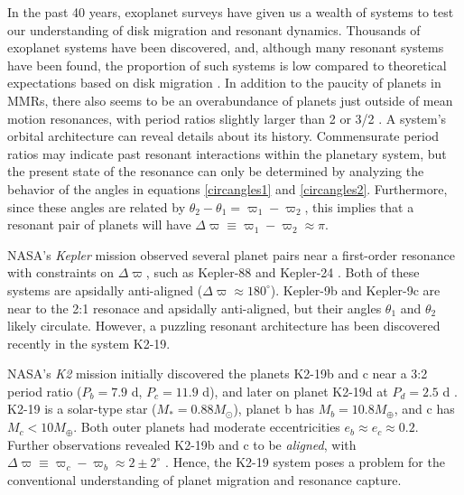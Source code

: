 \documentclass{mnras}
\begin{document}
In the past 40 years, exoplanet surveys have given us a wealth of
systems to test our understanding of disk migration and resonant
dynamics.  Thousands of exoplanet systems have been discovered, and,
although many resonant systems have been found, the proportion of such
systems is low compared to theoretical expectations based on disk
migration \cite{fabrycky_architecture_2014}.  In addition to the paucity
of planets in MMRs, there also seems to be an overabundance of planets
just outside of mean motion resonances, with period ratios slightly
larger than 2 or 3/2
\cite{fabrycky_architecture_2014,choksi_sub-neptune_2020}.  A system's
orbital architecture can reveal details about its history.
Commensurate period ratios may indicate past resonant interactions
within the planetary system, but the present state of the resonance
can only be determined by analyzing the behavior of the angles in
equations \eqref{circangles1} and \eqref{circangles2}.  Furthermore, since
these angles are related by \(\theta_2-\theta_1=\varpi_1-\varpi_2\),
this implies that a resonant pair of planets will have
\(\Delta\varpi\equiv \varpi_1-\varpi_2\approx \pi\).

NASA's \emph{Kepler} mission observed several planet pairs near a
first-order resonance with constraints on \(\Delta\varpi\), such as
Kepler-88 \cite{weiss_discovery_2020} and Kepler-24
\cite{antoniadou_exploiting_2020}. Both of these systems are apsidally
anti-aligned (\(\Delta\varpi\approx180^\circ\)).  Kepler-9b and
Kepler-9c are near to the 2:1 resonace and apsidally anti-aligned, but
their angles \(\theta_1\) and \(\theta_2\) likely circulate.  However, a
puzzling resonant architecture has been discovered recently in the
system K2-19.

NASA's \emph{K2} mission initially discovered the planets K2-19b and c
near a 3:2 period ratio (\(P_b=7.9\) d, \(P_c=11.9\) d), and later on
planet K2-19d at \(P_d=2.5\) d
\cite{howell14_k2_mission,armstrong15_one_closes_exopl_pairs_to,sinukoff16_eleven_multip_system_fromk_masses}.
K2-19 is a solar-type star (\(M_*=0.88M_\odot\)), planet b has
\(M_{b}=10.8 M_{\oplus}\), and c has \(M_{c}<10M_{\oplus}\).  Both outer
planets had moderate eccentricities \(e_b\approx e_c\approx 0.2\).
Further observations revealed K2-19b and c to be \emph{aligned}, with
\(\Delta\varpi\equiv \varpi_c-\varpi_b \approx 2\pm 2^\circ\)
\cite{petigura_k2-19b_2020}.  Hence, the K2-19 system poses a problem
for the conventional understanding of planet migration and resonance
capture.
\end{document}
